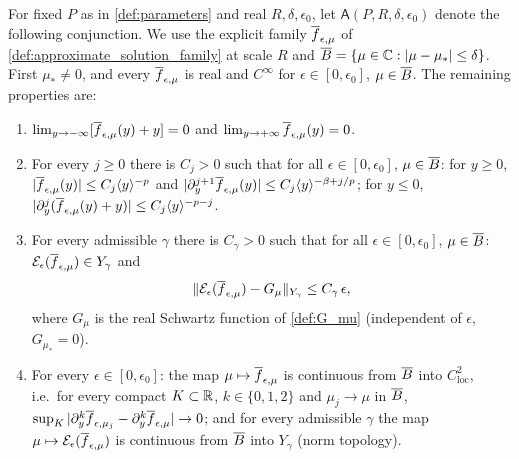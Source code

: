 \begin{definition}
  \label{def:c02_approximation_statement}
  For fixed $P$ as in \cref{def:parameters} and real $R,\delta,\epsilon_0$, let
  $\mathsf A(P,R,\delta,\epsilon_0)$ denote the following conjunction. We use the explicit family
  $\overline{f}_{\epsilon,\mu}$ of \cref{def:approximate_solution_family} at scale $R$ and
  $\overline{B}=\{\mu\in\mathbb{C}:|\mu-\mu_*|\le\delta\}$.
  First $\mu_*\ne0$, and every $\overline{f}_{\epsilon,\mu}$ is real and $C^\infty$ for
  $\epsilon\in[0,\epsilon_0]$, $\mu\in\overline{B}$. The remaining properties are:
  \begin{enumerate}
    \item $\lim_{y\to-\infty}[\overline{f}_{\epsilon,\mu}(y)+y]=0$ and $\lim_{y\to+\infty}\overline{f}_{\epsilon,\mu}(y)=0$.
    \item For every $j\ge0$ there is $C_j>0$ such that for all $\epsilon\in[0,\epsilon_0]$, $\mu\in\overline{B}$:
      for $y\ge0$, $|\overline{f}_{\epsilon,\mu}(y)|\le C_j\langle y \rangle^{-p}$ and $|\partial_y^{j+1}\overline{f}_{\epsilon,\mu}(y)|\le C_j\langle y \rangle^{-\beta+j/p}$;
      for $y\le0$, $|\partial_y^j(\overline{f}_{\epsilon,\mu}(y)+y)|\le C_j\langle y \rangle^{-p-j}$.
    \item For every admissible $\gamma$ there is $C_\gamma>0$ such that for all $\epsilon\in[0,\epsilon_0]$,
      $\mu\in\overline{B}$: $\mathcal{E}_\epsilon(\overline{f}_{\epsilon,\mu})\in Y_\gamma$ and
      \begin{equation}\label{eqn:fixed_point_residual_bound}
        \|\mathcal{E}_\epsilon(\overline{f}_{\epsilon,\mu})-G_\mu\|_{Y_\gamma}\le C_\gamma\,\epsilon,
      \end{equation}
      where $G_\mu$ is the real Schwartz function of \cref{def:G_mu} (independent of $\epsilon$, $G_{\mu_*}=0$).
    \item For every $\epsilon\in[0,\epsilon_0]$: the map $\mu\mapsto\overline{f}_{\epsilon,\mu}$ is continuous from $\overline{B}$ into
      $C^2_{\mathrm{loc}}$, i.e.\ for every compact $K\subset\mathbb{R}$, $k\in\{0,1,2\}$ and $\mu_j\to\mu$ in $\overline{B}$,
      $\sup_K|\partial^k_y\overline{f}_{\epsilon,\mu_j}-\partial^k_y\overline{f}_{\epsilon,\mu}|\to0$; and for every admissible $\gamma$ the map
      $\mu\mapsto\mathcal{E}_\epsilon(\overline{f}_{\epsilon,\mu})$ is continuous from $\overline{B}$ into $Y_\gamma$ (norm topology).
  \end{enumerate}
\end{definition}

